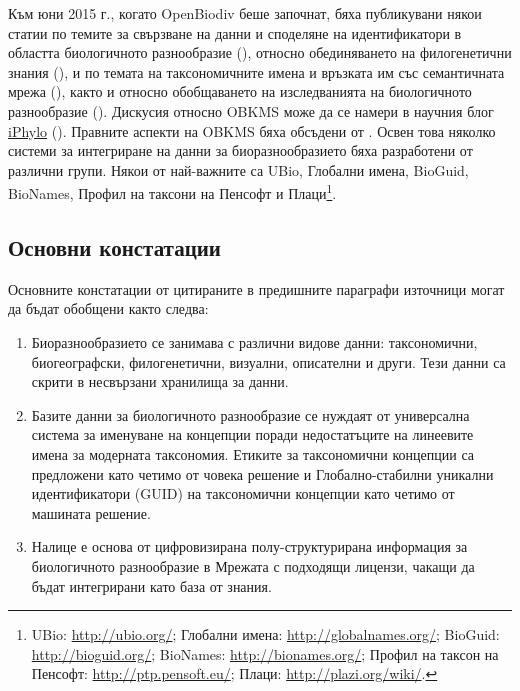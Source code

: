 Към  юни 2015 г., когато OpenBiodiv беше започнат, бяха публикувани някои статии  по темите за свързване на данни и споделяне на идентификатори в областта биологичното разнообразие (\cite{page_biodiversity_2008}), относно обединяването на филогенетични знания (\cite{parr_evolutionary_2012}), и по темата на таксономичните имена и връзката им със семантичната мрежа (\cite {page_taxonomic_2006, patterson_names_2010}), както и относно обобщаването на изследванията на биологичното разнообразие (\cite{mindell_aggregating_2011}). Дискусия относно OBKMS може да се намери в научния блог \href {http://iphylo.blogspot.bg}{iPhylo} (\cite {page_vision_2014, page_putting_2015}). Правните аспекти на OBKMS бяха обсъдени от \cite {egloff_open_2014}. Освен това няколко системи за интегриране на данни за биоразнообразието бяха разработени от различни групи. Някои от най-важните са UBio, Глобални имена, BioGuid, BioNames, Профил на таксони на Пенсофт и Плаци\footnote{UBio: \href{http://ubio.org/}{http://ubio.org/}; Глобални имена: \href {http://globalnames.org/}{http://globalnames.org/}; BioGuid: \href {http://bioguid.org/}{http://bioguid.org/}; BioNames: \href{http://bionames.org/}{http://bionames.org/}; Профил на таксон на Пенсофт: \href {http://ptp.pensoft.eu/}{http://ptp.pensoft.eu/}; Плаци: \href {http://plazi.org/wiki/} {http://plazi.org/wiki/}.}.

\subsection*{Основни констатации}

Основните констатации от цитираните в предишните параграфи източници могат да бъдат обобщени както следва:

\begin{enumerate}

\item{Биоразнообразието се занимава с различни видове данни: таксономични, биогеографски, филогенетични, визуални, описателни и други. Тези данни са скрити в несвързани хранилища за данни.}

\item{Базите данни за биологичното разнообразие се нуждаят от универсална система за именуване на концепции поради недостатъците на линеевите имена за модерната таксономия. Етиките за таксономични концепции са предложени като четимо от човека решение и Глобално-стабилни уникални идентификатори (GUID) на таксономични концепции като четимо от машината решение.}

\item{Налице е основа от цифровизирана полу-структурирана информация за биологичното разнообразие в Мрежата с подходящи лицензи, чакащи да бъдат интегрирани като база от знания.}

\end{enumerate}

